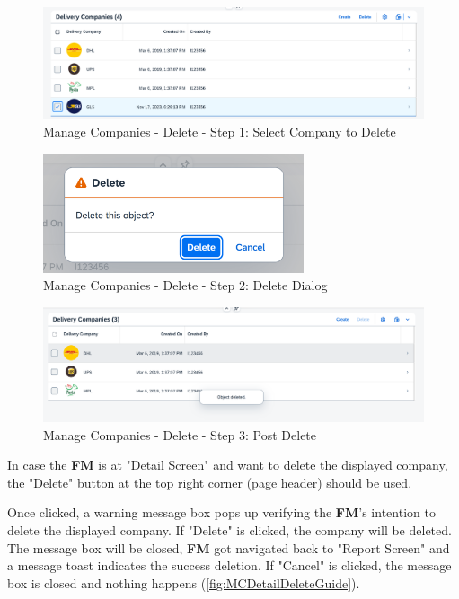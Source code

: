 \begin{figure}[H]
	\centering
	\includegraphics[width=0.90\linewidth]{images/user_doc/company/report/deleteBtnEnable.png}
	\caption{Manage Companies - Delete - Step 1: Select Company to Delete}
	\label{fig:MCReportDeleteStep1}
\end{figure}

\begin{figure}[H]
	\centering
	\includegraphics[height=100pt]{images/user_doc/company/report/deleteConfirmaton2.png}
	\caption{Manage Companies - Delete - Step 2: Delete Dialog}
	\label{fig:MCReportDeleteDlg}
\end{figure}

\begin{figure}[H]
	\centering
	\includegraphics[width=0.90\linewidth]{images/user_doc/company/report/deleteToast.png}
	\caption{Manage Companies - Delete - Step 3: Post Delete}
	\label{fig:MCReportDeleteStep3}
\end{figure}

\bigskip
In case the \textbf{FM} is at "Detail Screen" and want to delete the displayed company, the "Delete" button at the top right corner (page header) should be used. 

Once clicked, a warning message box pops up verifying the \textbf{FM}'s intention to delete the displayed company. If "Delete" is clicked, the company will be deleted. The message box will be closed, \textbf{FM} got navigated back to "Report Screen" and a message toast indicates the success deletion. If "Cancel" is clicked, the message box is closed and nothing happens (\autoref{fig:MCDetailDeleteGuide}).

